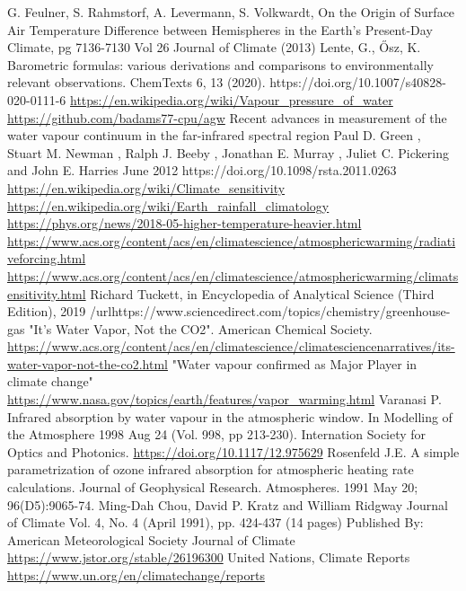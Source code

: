 \documentclass{book}
\begin{document}
\begin{thebibliography}{99}
		 G. Feulner, S. Rahmstorf, A. Levermann, S. Volkwardt, On the Origin of Surface Air Temperature Difference between Hemispheres in the Earth's Present-Day Climate,
		pg 7136-7130 Vol 26 Journal of Climate (2013)
		 Lente, G., Ősz, K. Barometric formulas: various derivations and comparisons to environmentally relevant observations. ChemTexts 6, 13 (2020). https://doi.org/10.1007/s40828-020-0111-6
		 \url{https://en.wikipedia.org/wiki/Vapour_pressure_of_water}
		 \url{https://github.com/badams77-cpu/agw}
		 Recent advances in measurement of the water vapour continuum in the far-infrared spectral region
		Paul D. Green
		, Stuart M. Newman
		, Ralph J. Beeby
		, Jonathan E. Murray
		, Juliet C. Pickering
		and John E. Harries
		June 2012 https://doi.org/10.1098/rsta.2011.0263
			\url{https://en.wikipedia.org/wiki/Climate_sensitivity}
		 \url{https://en.wikipedia.org/wiki/Earth_rainfall_climatology}
		 \url{https://phys.org/news/2018-05-higher-temperature-heavier.html}
		 \url{https://www.acs.org/content/acs/en/climatescience/atmosphericwarming/radiativeforcing.html}
		 \url{https://www.acs.org/content/acs/en/climatescience/atmosphericwarming/climatsensitivity.html}
		 Richard Tuckett, in Encyclopedia of Analytical Science (Third Edition), 2019 /url{https://www.sciencedirect.com/topics/chemistry/greenhouse-gas}
		  "It's Water Vapor, Not the CO2". American Chemical Society. \url{https://www.acs.org/content/acs/en/climatescience/climatesciencenarratives/its-water-vapor-not-the-co2.html}
		  "Water vapour confirmed as Major Player in climate change" \url{https://www.nasa.gov/topics/earth/features/vapor_warming.html}
		 Varanasi P. Infrared absorption by water vapour in the atmospheric window. In Modelling of the Atmosphere 1998 Aug 24 (Vol. 998, pp 213-230). Internation Society for Optics and Photonics.
		\url{https://doi.org/10.1117/12.975629}
		 Rosenfeld J.E. A simple parametrization of ozone infrared absorption for atmospheric heating rate calculations. Journal of Geophysical Research. Atmospheres. 1991 May 20; 96(D5):9065-74.
		  Ming-Dah Chou, David P. Kratz and William Ridgway 
		Journal of Climate
		Vol. 4, No. 4 (April 1991), pp. 424-437 (14 pages)
		Published By: American Meteorological Society
		Journal of Climate    \url{https://www.jstor.org/stable/26196300}
		 United Nations, Climate Reports \url{https://www.un.org/en/climatechange/reports}
	\end{thebibliography}
	
\end{document}
